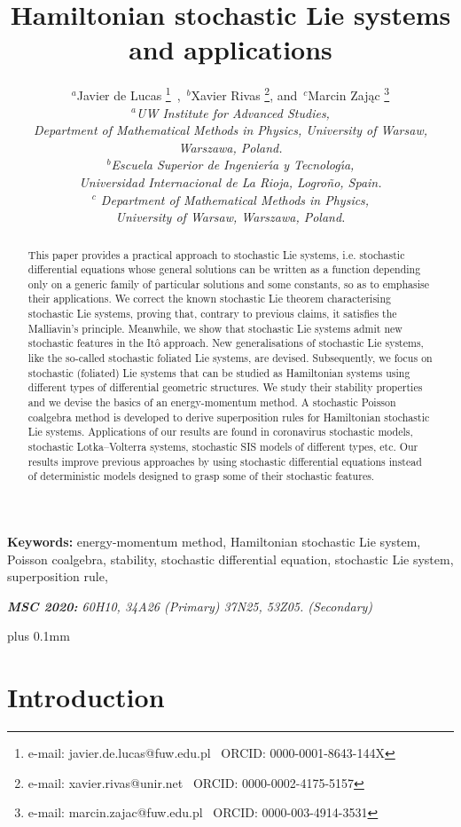 \documentclass[11pt]{article}
\title{{\sffamily Hamiltonian stochastic Lie systems  and applications}}
\author{{\sffamily 
$^a$Javier de Lucas%
\thanks{e-mail:
   javier.de.lucas@fuw.edu.pl \ ORCID: 0000-0001-8643-144X}\ ,\
$^b$Xavier Rivas%
\thanks{e-mail:
   xavier.rivas@unir.net \ ORCID: 0000-0002-4175-5157}, and\
$^c$Marcin Zaj\k ac%
\thanks{e-mail:
   marcin.zajac@fuw.edu.pl \ ORCID: 0000-003-4914-3531}
}
\\[1ex]
\normalsize\itshape\sffamily
$^a$UW Institute for Advanced Studies,\\
\normalsize\itshape\sffamily
Department of Mathematical Methods in Physics, University of Warsaw, Warszawa, Poland.
\\[1ex]
\normalsize\itshape\sffamily
$^b$Escuela Superior de Ingenier\'{\i}a y Tecnolog\'{\i}a,\\
\normalsize\itshape\sffamily
Universidad Internacional de La Rioja, Logro\~no, Spain.
\\[1ex]
\normalsize\itshape\sffamily
$^c$  Department of Mathematical Methods in Physics,
\\
\normalsize\itshape\sffamily
University of Warsaw, Warszawa, Poland.
\\[1ex]
}
\theoremstyle{plain}
\theoremstyle{definition}
\begin{document}
\maketitle
\begin{abstract}

This paper provides a practical approach to stochastic Lie systems, i.e.  stochastic differential equations whose general solutions can be written as a function depending only on a generic family of particular solutions and some constants, so as to emphasise their applications. We correct the known stochastic Lie theorem characterising stochastic Lie systems, proving that, contrary to previous claims, it satisfies the Malliavin's principle. Meanwhile, we show that stochastic Lie systems admit new stochastic features in the It\^{o} approach. New generalisations of stochastic Lie systems, like the so-called stochastic foliated Lie systems, are devised. Subsequently, we focus on stochastic (foliated) Lie systems that can be studied as Hamiltonian systems using different types of differential geometric structures. We study their stability properties and we devise the basics of an energy-momentum method. A stochastic Poisson coalgebra method is developed to derive superposition rules for Hamiltonian stochastic Lie systems. Applications of our results are found in coronavirus stochastic models, stochastic Lotka--Volterra systems, stochastic SIS models of different types, etc. Our results improve previous approaches by using stochastic differential equations instead of deterministic models designed to grasp some of their stochastic features.
\end{abstract}


\noindent\textbf{Keywords:} 
energy-momentum method,
Hamiltonian stochastic Lie system,
Poisson coalgebra, 
stability,
stochastic differential equation, 
stochastic Lie system,
superposition rule,
\bigskip

\noindent\textit{{\bf MSC 2020:} 
60H10, %
34A26 %
(Primary)
37N25, %
53Z05. %
(Secondary)
}

\bigskip

{\setcounter{tocdepth}{2}
\def\baselinestretch{1}
\small
\def\addvspace#1{\vskip 1pt}
\parskip 0pt plus 0.1mm
\tableofcontents
}

\section{Introduction}
\end{document}
